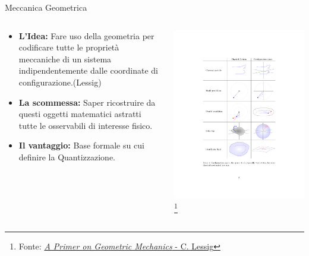 \documentclass[8pt,handout]{beamer}
\begin{document}
		\begin{frame}{Meccanica Geometrica}
  			\begin{columns}[T]
    			\begin{column}{.5\textwidth}		
					\begin{itemize}
						\item \textbf{L'Idea:} Fare uso della geometria per codificare tutte le proprietà meccaniche di un sistema indipendentemente dalle coordinate di configurazione.(Lessig)
						\item \textbf{La scommessa:} Saper ricostruire da questi oggetti matematici astratti tutte le osservabili di interesse fisico.
						\item \textbf{Il vantaggio:} Base formale su cui definire la Quantizzazione.
					\end{itemize}
    			\end{column}
    		   	\begin{column}{.5\textwidth}
							\includegraphics[width=\textwidth]{Pic/GeoMec_Crop} 		
							 \center \footnote{Fonte: 
 								\href{http://arxiv.org/abs/1206.3302}{\emph{A Primer on Geometric Mechanics} - C. Lessig}
  							}	
    			\end{column}
  			\end{columns}	
	\end{frame}
\end{document}
